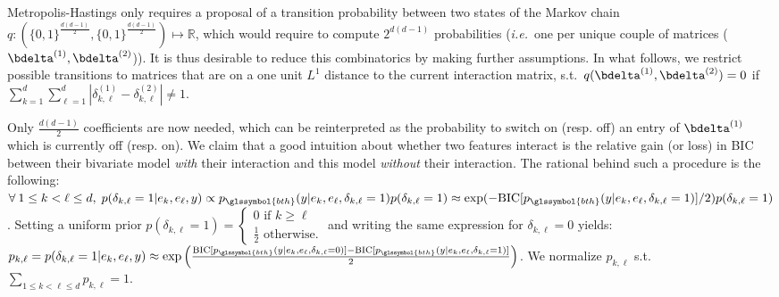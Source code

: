 {{{Metropolis-Hastings only requires a proposal of a transition probability between two states of the Markov chain $q: ({\{0,1\}}^{\frac{d(d-1)}{2}},{\{0,1\}}^{\frac{d(d-1)}{2}}) \mapsto \mathbb{R}$, which would require to compute $2^{d(d-1)}$ probabilities (\textit{i.e.}\ one per unique couple of matrices ($\bdelta^{(1)},\bdelta^{(2)}$)). It is thus desirable to reduce this combinatorics by making further assumptions. In what follows, we restrict possible transitions to matrices that are on a one unit $L^1$ distance to the current interaction matrix, s.t.\ $q(\bdelta^{(1)},\bdelta^{(2)}) = 0$ if $\sum_{k=1}^d \sum_{\ell=1}^d |\delta^{(1)}_{k,\ell} - \delta^{(2)}_{k,\ell}| \neq 1$.

Only $\frac{d(d-1)}{2}$ coefficients are now needed, which can be reinterpreted as the probability to switch on (resp. off) an entry of $\bdelta^{(1)}$ which is currently off (resp. on). We claim that a good intuition about whether two features interact is the relative gain (or loss) in BIC between their bivariate model \textit{with} their interaction and this model \textit{without} their interaction. The rational behind such a procedure is the following: $\forall \: 1 \leq k < \ell \leq d, \; p(\delta_{k,\ell}=1 | e_k, e_{\ell}, y) \propto p_{\glssymbol{bth}}(y | e_k, e_{\ell}, \delta_{k,\ell}=1) p(\delta_{k,\ell}=1) \approx \exp(-\text{BIC}[p_{\glssymbol{bth}}(y | e_k, e_{\ell}, \delta_{k,\ell}=1)]/2) p(\delta_{k,\ell}=1)$. Setting a uniform prior $p(\delta_{k,\ell}=1) =\begin{cases} 0 \text{ if } k \geq \ell \\ \frac{1}{2} \text{ otherwise.} \end{cases}$ and writing the same expression for $\delta_{k,\ell} = 0$ yields: $p_{k,\ell} = p(\delta_{k,\ell}=1 | e_k, e_{\ell}, y) \approx \exp \left( \frac{\text{BIC}[p_{\glssymbol{bth}}(y | e_k, e_{\ell}, \delta_{k,\ell}=0)]-\text{BIC}[p_{\glssymbol{bth}}(y | e_k, e_{\ell}, \delta_{k,\ell}=1)]}{2} \right)$. We normalize $p_{k,\ell}$ s.t.\ $\sum_{1 \leq k < \ell \leq d} p_{k,\ell} = 1$.

}}}
